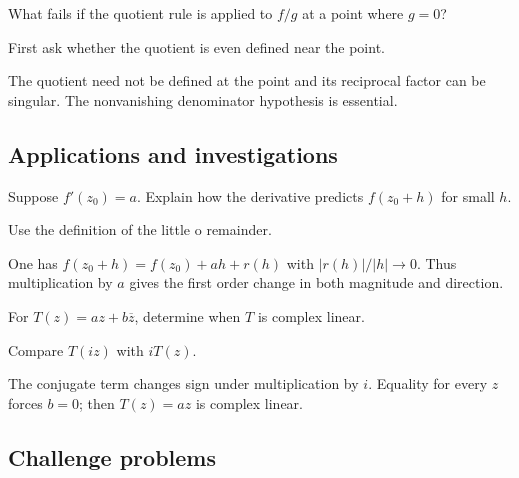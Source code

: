 \begin{exercise}\label{exr:iv01-expand-12}
What fails if the quotient rule is applied to \(f/g\) at a point where \(g=0\)?
\end{exercise}
\begin{hint}
First ask whether the quotient is even defined near the point.
\end{hint}
\begin{solution}
The quotient need not be defined at the point and its reciprocal factor can be singular. The nonvanishing denominator hypothesis is essential.
\end{solution}

\subsection*{Applications and investigations}

\begin{exercise}\label{exr:iv01-expand-13}
Suppose \(f'(z_0)=a\). Explain how the derivative predicts \(f(z_0+h)\) for small \(h\).
\end{exercise}
\begin{hint}
Use the definition of the little o remainder.
\end{hint}
\begin{solution}
One has \(f(z_0+h)=f(z_0)+ah+r(h)\) with \(|r(h)|/|h|\to0\). Thus multiplication by \(a\) gives the first order change in both magnitude and direction.
\end{solution}

\begin{exercise}\label{exr:iv01-expand-14}
For \(T(z)=az+b\overline z\), determine when \(T\) is complex linear.
\end{exercise}
\begin{hint}
Compare \(T(iz)\) with \(iT(z)\).
\end{hint}
\begin{solution}
The conjugate term changes sign under multiplication by \(i\). Equality for every \(z\) forces \(b=0\); then \(T(z)=az\) is complex linear.
\end{solution}

\subsection*{Challenge problems}

